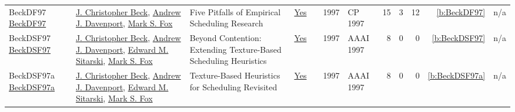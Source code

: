 {\begin{longtable}{>{\raggedright\arraybackslash}p{3cm}>{\raggedright\arraybackslash}p{6cm}>{\raggedright\arraybackslash}p{6.5cm}rrrp{2.5cm}rrrrr}
BeckDF97 \href{https://doi.org/10.1007/BFb0017455}{BeckDF97} & \hyperref[auth:a89]{J. Christopher Beck}, \hyperref[auth:a250]{Andrew J. Davenport}, \hyperref[auth:a304]{Mark S. Fox} & Five Pitfalls of Empirical Scheduling Research & \href{../works/BeckDF97.pdf}{Yes} & \cite{BeckDF97} & 1997 & CP 1997 & 15 & 3 & 12 & \ref{b:BeckDF97} & n/a\\
BeckDSF97 \href{http://www.aaai.org/Library/AAAI/1997/aaai97-037.php}{BeckDSF97} & \hyperref[auth:a89]{J. Christopher Beck}, \hyperref[auth:a250]{Andrew J. Davenport}, \hyperref[auth:a1311]{Edward M. Sitarski}, \hyperref[auth:a304]{Mark S. Fox} & Beyond Contention: Extending Texture-Based Scheduling Heuristics & \href{../works/BeckDSF97.pdf}{Yes} & \cite{BeckDSF97} & 1997 & AAAI 1997 & 8 & 0 & 0 & \ref{b:BeckDSF97} & n/a\\
BeckDSF97a \href{http://www.aaai.org/Library/AAAI/1997/aaai97-038.php}{BeckDSF97a} & \hyperref[auth:a89]{J. Christopher Beck}, \hyperref[auth:a250]{Andrew J. Davenport}, \hyperref[auth:a1311]{Edward M. Sitarski}, \hyperref[auth:a304]{Mark S. Fox} & Texture-Based Heuristics for Scheduling Revisited & \href{../works/BeckDSF97a.pdf}{Yes} & \cite{BeckDSF97a} & 1997 & AAAI 1997 & 8 & 0 & 0 & \ref{b:BeckDSF97a} & n/a\\
\end{longtable}
}

\clearpage
